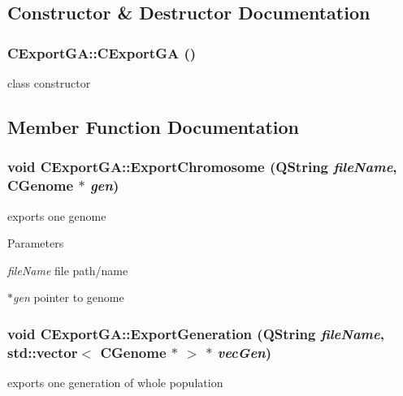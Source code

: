 \subsection{Constructor \& Destructor Documentation}
\hypertarget{classCExportGA_a309d0b41af0bc98a55137036dae666c0}{
\subsubsection[{CExportGA}]{\setlength{\rightskip}{0pt plus 5cm}CExportGA::CExportGA ()}}
\label{classCExportGA_a309d0b41af0bc98a55137036dae666c0}
class constructor 

\subsection{Member Function Documentation}
\hypertarget{classCExportGA_ac9f851d52b55ecca7a4b4d318d673f24}{
\subsubsection[{ExportChromosome}]{\setlength{\rightskip}{0pt plus 5cm}void CExportGA::ExportChromosome (QString {\em fileName}, \/  {\bf CGenome} $\ast$ {\em gen})}}
\label{classCExportGA_ac9f851d52b55ecca7a4b4d318d673f24}
exports one genome


\begin{DoxyParams}{Parameters}
\item[{\em fileName}]file path/name \item[{\em $\ast$gen}]pointer to genome \end{DoxyParams}
\hypertarget{classCExportGA_a31d3ac536a7ff74d7739208effef4bd7}{
\subsubsection[{ExportGeneration}]{\setlength{\rightskip}{0pt plus 5cm}void CExportGA::ExportGeneration (QString {\em fileName}, \/  std::vector$<$ {\bf CGenome} $\ast$ $>$ $\ast$ {\em vecGen})}}
\label{classCExportGA_a31d3ac536a7ff74d7739208effef4bd7}
exports one generation of whole population


